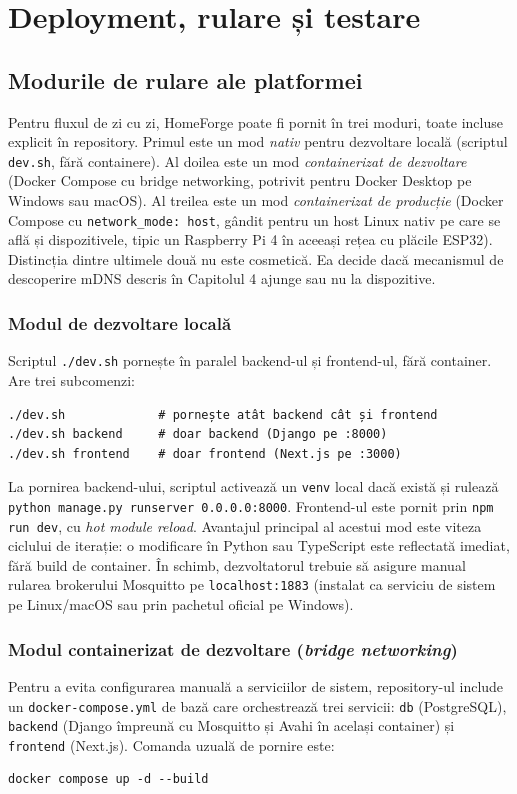 \chapter{Deployment, rulare și testare}

\section{Modurile de rulare ale platformei}
Pentru fluxul de zi cu zi, HomeForge poate fi pornit în trei moduri, toate incluse explicit în repository. Primul este un mod \emph{nativ} pentru dezvoltare locală (scriptul \texttt{dev.sh}, fără containere). Al doilea este un mod \emph{containerizat de dezvoltare} (Docker Compose cu bridge networking, potrivit pentru Docker Desktop pe Windows sau macOS). Al treilea este un mod \emph{containerizat de producție} (Docker Compose cu \texttt{network\_mode: host}, gândit pentru un host Linux nativ pe care se află și dispozitivele, tipic un Raspberry Pi 4 în aceeași rețea cu plăcile ESP32). Distincția dintre ultimele două nu este cosmetică. Ea decide dacă mecanismul de descoperire mDNS descris în Capitolul 4 ajunge sau nu la dispozitive.

\subsection{Modul de dezvoltare locală}
Scriptul \texttt{./dev.sh} pornește în paralel backend-ul și frontend-ul, fără container. Are trei subcomenzi:
\begin{verbatim}
./dev.sh             # pornește atât backend cât și frontend
./dev.sh backend     # doar backend (Django pe :8000)
./dev.sh frontend    # doar frontend (Next.js pe :3000)
\end{verbatim}
La pornirea backend-ului, scriptul activează un \texttt{venv} local dacă există și rulează \texttt{python manage.py runserver 0.0.0.0:8000}. Frontend-ul este pornit prin \texttt{npm run dev}, cu \emph{hot module reload}. Avantajul principal al acestui mod este viteza ciclului de iterație: o modificare în Python sau TypeScript este reflectată imediat, fără build de container. În schimb, dezvoltatorul trebuie să asigure manual rularea brokerului Mosquitto pe \texttt{localhost:1883} (instalat ca serviciu de sistem pe Linux/macOS sau prin pachetul oficial pe Windows).

\subsection{Modul containerizat de dezvoltare (\emph{bridge networking})}
Pentru a evita configurarea manuală a serviciilor de sistem, repository-ul include un \texttt{docker-compose.yml} de bază care orchestrează trei servicii: \texttt{db} (PostgreSQL), \texttt{backend} (Django împreună cu Mosquitto și Avahi în același container) și \texttt{frontend} (Next.js). Comanda uzuală de pornire este:
\begin{verbatim}
docker compose up -d --build
\end{verbatim}

